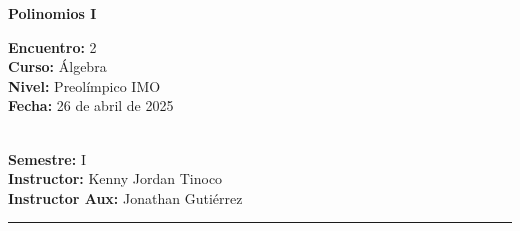 
\begin{center}
    \textbf{\Large Polinomios I}
\end{center}

\begin{multicols}{2}
{
    \textbf{Encuentro:} 2\\
    \textbf{Curso:} Álgebra\\
    \textbf{Nivel:} Preolímpico IMO\\
    \textbf{Fecha:} 26 de abril de 2025\\
    \begin{flushright}
        \ \\
        \textbf{Semestre:} I\\
        \textbf{Instructor:} Kenny Jordan Tinoco\\
        \textbf{Instructor Aux:} Jonathan Gutiérrez
    \end{flushright}
}
\end{multicols}
\hrule
\tableofcontents

\thispagestyle{first-page-style}